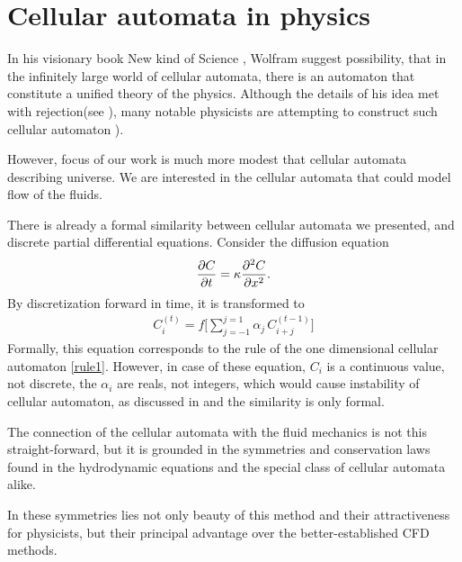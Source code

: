 



\section{Cellular automata in physics}
In his visionary book New kind of Science \cite{wolf}, Wolfram suggest possibility, that in the infinitely large world of cellular automata, there is an automaton that constitute a unified theory of the physics.
Although the details of his idea met with rejection(see \cite{aaronson}),
many notable physicists are attempting to construct such cellular automaton \cite{hooft}).
%

However, focus of our work is much more modest that cellular automata describing universe.
We are interested in the cellular automata that could model flow of the fluids.

There is already a formal similarity between cellular automata we presented, and discrete partial differential equations. Consider the diffusion equation
\begin{align*}
\frac{\partial C}{\partial t} = \kappa \frac{\partial^2 C}{\partial x^2}.
\end{align*}
By discretization forward in time, it is transformed to
\begin{align*}
C_i^{(t)} = f\big[\sum_{j=-1}^{j=1}\alpha_j \, C_{i+j}^{(t-1)} \big]
\end{align*}
Formally, this equation corresponds to the rule of the one dimensional cellular automaton \ref{rule1}. However, in case of these equation, $C_i$ is a continuous value, not discrete, the $\alpha_i$ are reals, not integers, which would cause instability of cellular automaton, as discussed in \cite{wolf} and the similarity is only formal.

The connection of the cellular automata with the fluid mechanics is not this straight-forward, but it is grounded in the symmetries and conservation laws found in the hydrodynamic equations and the special class of cellular automata alike.

In these symmetries lies not only beauty of this method and their attractiveness for physicists, but their principal advantage over the better-established CFD methods.